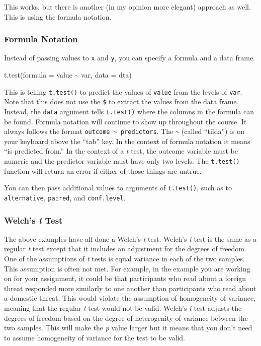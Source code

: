 \documentclass[
]{book}
\newenvironment{Shaded}{\begin{snugshade}}{\end{snugshade}}
\newcommand{\AttributeTok}[1]{\textcolor[rgb]{0.77,0.63,0.00}{#1}}
\newcommand{\FunctionTok}[1]{\textcolor[rgb]{0.00,0.00,0.00}{#1}}
\newcommand{\NormalTok}[1]{#1}
\newcommand{\SpecialCharTok}[1]{\textcolor[rgb]{0.00,0.00,0.00}{#1}}
\begin{document}
This works, but there is another (in my opinion more elegant) approach as well. This is using the formula notation.

\hypertarget{formula-notation}{%
\subsubsection{Formula Notation}\label{formula-notation}}

Instead of passing values to \texttt{x} and \texttt{y}, you can specify a formula and a data frame.

\begin{Shaded}
\begin{Highlighting}[]
\FunctionTok{t.test}\NormalTok{(}\AttributeTok{formula =}\NormalTok{ value }\SpecialCharTok{\textasciitilde{}}\NormalTok{ var, }\AttributeTok{data =}\NormalTok{ dta)}
\end{Highlighting}
\end{Shaded}

This is telling \texttt{t.test()} to predict the values of \texttt{value} from the levels of \texttt{var}. Note that this does not use the \texttt{\$} to extract the values from the data frame. Instead, the \texttt{data} argument tells \texttt{t.test()} where the columns in the formula can be found. Formula notation will continue to show up throughout the course. It always follows the format \texttt{outcome\ \textasciitilde{}\ predictors}. The \texttt{\textasciitilde{}} (called ``tilda'') is on your keyboard above the ``tab'' key. In the context of formula notation it means ``is predicted from.'' In the context of a \emph{t} test, the outcome variable must be numeric and the predictor variable must have only two levels. The \texttt{t.test()} function will return an error if either of those things are untrue.

You can then pass additional values to arguments of \texttt{t.test()}, such as to \texttt{alternative}, \texttt{paired}, and \texttt{conf.level}.

\hypertarget{welchs-t-test}{%
\subsubsection{\texorpdfstring{Welch's \emph{t} Test}{Welch's t Test}}\label{welchs-t-test}}

The above examples have all done a Welch's \emph{t} test. Welch's \emph{t} test is the same as a regular \emph{t} test except that it includes an adjustment for the degrees of freedom. One of the assumptions of \emph{t} tests is equal variance in each of the two samples. This assumption is often not met. For example, in the example you are working on for your assignment, it could be that participants who read about a foreign threat responded more similarly to one another than participants who read about a domestic threat. This would violate the assumption of homogeneity of variance, meaning that the regular \emph{t} test would not be valid. Welch's \emph{t} test adjusts the degrees of freedom based on the degree of heterogenity of variance between the two samples. This will make the \emph{p} value larger but it means that you don't need to assume homogeneity of variance for the test to be valid.
\end{document}
